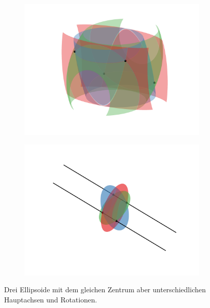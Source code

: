\documentclass[a4paper,oneside, 11pt, openany%
]{article}
\theoremstyle{custom}
\theoremstyle{custom}
\begin{document}
		\begin{figure}[H]\ContinuedFloat
			\begin{subfigure}[b]{0.8\textwidth}
				\includegraphics[width=\textwidth]{"images/e3q3_example3_zoom.png"}
			\end{subfigure}
		\end{figure}
		\begin{figure}[H]\ContinuedFloat
			\begin{subfigure}[b]{0.8\textwidth}
				\includegraphics[width=\textwidth]{"images/e3q3_example3_lines.png"}
			\end{subfigure}
			\caption{Drei Ellipsoide mit dem gleichen Zentrum aber unterschiedlichen Hauptachsen und Rotationen.}
		\end{figure}
	
\end{document}
